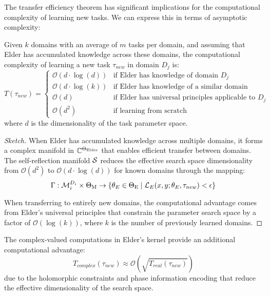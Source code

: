 The transfer efficiency theorem has significant implications for the computational complexity of learning new tasks. We can express this in terms of asymptotic complexity:

\begin{theorem}
Given $k$ domains with an average of $m$ tasks per domain, and assuming that Elder has accumulated knowledge across these domains, the computational complexity of learning a new task $\tau_{new}$ in domain $D_j$ is:
\begin{equation}
T(\tau_{new}) = 
\begin{cases}
\mathcal{O}(d \cdot \log(d)) & \text{if Elder has knowledge of domain $D_j$} \\
\mathcal{O}(d \cdot \log(k)) & \text{if Elder has knowledge of a similar domain} \\
\mathcal{O}(d) & \text{if Elder has universal principles applicable to $D_j$} \\
\mathcal{O}(d^2) & \text{if learning from scratch}
\end{cases}
\end{equation}
where $d$ is the dimensionality of the task parameter space.
\end{theorem}

\begin{proof}[Sketch]
When Elder has accumulated knowledge across multiple domains, it forms a complex manifold in $\mathbb{C}^{\Theta_{\text{Elder}}}$ that enables efficient transfer between domains. The self-reflection manifold $\mathcal{S}$ reduces the effective search space dimensionality from $\mathcal{O}(d^2)$ to $\mathcal{O}(d \cdot \log(d))$ for known domains through the mapping:
\begin{equation}
\Gamma: \mathcal{M}_i^{D_i} \times \Theta_{\text{M}} \rightarrow \{\theta_E \in \Theta_{\text{E}} \mid \mathcal{L}_E(x, y; \theta_E, \tau_{new}) < \epsilon\}
\end{equation}

When transferring to entirely new domains, the computational advantage comes from Elder's universal principles that constrain the parameter search space by a factor of $\mathcal{O}(\log(k))$, where $k$ is the number of previously learned domains.
\end{proof}

\begin{corollary}
The complex-valued computations in Elder's kernel provide an additional computational advantage:
\begin{equation}
T_{complex}(\tau_{new}) \approx \mathcal{O}(\sqrt{T_{real}(\tau_{new})})
\end{equation}
due to the holomorphic constraints and phase information encoding that reduce the effective dimensionality of the search space.
\end{corollary}

